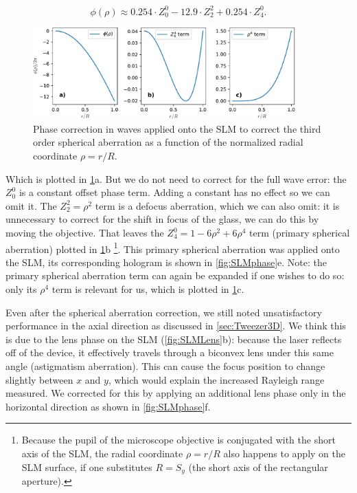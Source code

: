 \begin{equation}\label{eq:ZernikeExpansion}
    \phi(\rho) \approx 0.254 \cdot Z_0^0 - 12.9 \cdot Z_2^2 + 0.254\cdot Z_4^0.
\end{equation}
\begin{figure}
    \centering
    \includegraphics[width=0.9\textwidth]{figures/SphericalAberrationTerms.pdf}
    \caption{Phase correction in waves applied onto the SLM to correct the third order spherical aberration as a function of the normalized radial coordinate $\rho=r/R$.}
    \label{fig:AberrationTerm}
\end{figure}
Which is plotted in \cref{fig:AberrationTerm}a.
But we do not need to correct for the full wave error: the $Z_0^0$ is a constant offset phase term. 
Adding a constant has no effect so we can omit it. 
The $Z_2^2 = \rho^2$ term is a defocus aberration, which we can also omit: it is unnecessary to correct for the shift in focus of the glass, we can do this by moving the objective. 
That leaves the $Z_4^0 = 1 - 6\rho^2+6\rho^4$ term (primary spherical aberration) plotted in \cref{fig:AberrationTerm}b \footnote{Because the pupil of the microscope objective is conjugated with the short axis of the SLM, the radial coordinate $\rho =r/R$ also happens to apply on the SLM surface, if one substitutes $R=S_y$ (the short axis of the rectangular aperture).}.
This primary spherical aberration was applied onto the SLM, its corresponding hologram is shown in \cref{fig:SLMphase}e.
Note: the primary spherical aberration term can again be expanded if one wishes to do so: only its $\rho^4$ term is relevant for us, which is plotted in \cref{fig:AberrationTerm}c. 


Even after the spherical aberration correction, we still noted unsatisfactory performance in the axial direction as discussed in \cref{sec:Tweezer3D}. 
We think this is due to the lens phase on the SLM (\cref{fig:SLMLens}b): because the laser reflects off of the device, it effectively travels through a biconvex lens under this same angle (astigmatism aberration). 
This can cause the focus position to change slightly between $x$ and $y$, which would explain the increased Rayleigh range measured. 
We corrected for this by applying an additional lens phase only in the horizontal direction as shown in \cref{fig:SLMphase}f.


